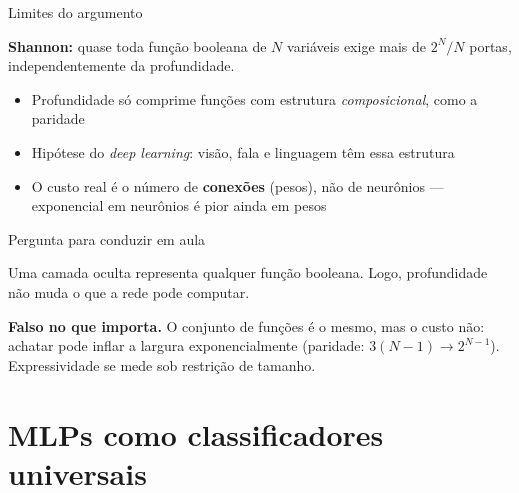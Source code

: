 \documentclass[aspectratio=169, 11pt]{beamer}
\begin{document}
\begin{frame}{Limites do argumento}

  \begin{alertabox}
    \textbf{Shannon:} quase toda função booleana de $N$ variáveis exige mais
    de $2^N/N$ portas, \alert{independentemente da profundidade}.
  \end{alertabox}

  \smallskip
  \begin{itemize}\setlength{\itemsep}{0.25ex}
    \item Profundidade só comprime funções com estrutura
          \emph{composicional}, como a paridade
    \item Hipótese do \emph{deep learning}: visão, fala e linguagem têm
          essa estrutura
    \item O custo real é o número de \textbf{conexões} (pesos), não de
          neurônios — exponencial em neurônios é pior ainda em pesos
  \end{itemize}
\end{frame}

\begin{frame}{Pergunta para conduzir em aula}

  \begin{quizbox}
    Uma camada oculta representa qualquer função booleana. Logo,
    profundidade não muda o que a rede pode computar.

    \smallskip
  \end{quizbox}

  \pause

  \begin{respbox}
    \textbf{Falso no que importa.} O conjunto de funções é o mesmo, mas o
    custo não: achatar pode inflar a largura exponencialmente (paridade:
    $3(N-1) \to 2^{N-1}$). Expressividade se mede \alert{sob restrição de
    tamanho}.
  \end{respbox}
\end{frame}

\section{MLPs como classificadores universais}
\end{document}
